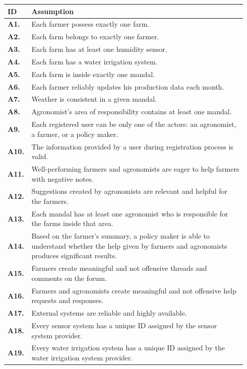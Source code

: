 \begin{longtable}{@{}p{0.06\linewidth} p{0.88\linewidth}}
	\toprule
	\textbf{ID}   & \textbf{Assumption}\\
	\midrule
    \textbf{A1.} & Each farmer possess exactly one farm.\\
    \textbf{A2.} & Each farm belongs to exactly one farmer.\\ 
    \textbf{A3.} & Each farm has at least one humidity sensor.\\ 
    \textbf{A4.} & Each farm has a water irrigation system.\\ 
    \textbf{A5.} & Each farm is inside exactly one mandal.\\ 
    \textbf{A6.} & Each farmer reliably updates his production data each month.\\ 
    \textbf{A7.} & Weather is consistent in a given mandal.\\ 
    \textbf{A8.} & Agronomist's area of responsibility contains at least one mandal.\\ 
    \textbf{A9.} & Each registered user can be only one of the actors: an agronomist, a farmer, or a policy maker.\\ 
    \textbf{A10.} & The information provided by a user during registration process is valid.\\ 
    \textbf{A11.} & Well-performing farmers and agronomists are eager to help farmers with negative notes.\\ 
    \textbf{A12.} & Suggestions created by agronomists are relevant and helpful for the farmers. \\
    \textbf{A13.} & Each mandal has at least one agronomist who is responsible for the farms inside that area.\\ 
    \textbf{A14.} & Based on the farmer's summary, a policy maker is able to understand whether the help given by farmers and agronomists produces significant results.\\ 
    \textbf{A15.} & Farmers create meaningful and not offensive threads and comments on the forum.\\ 
    \textbf{A16.} & Farmers and agronomists create meaningful and not offensive help requests and responses. \\
    \textbf{A17.} & External systems are reliable and highly available.\\
    \textbf{A18.} & Every sensor system has a unique ID assigned by the sensor system provider. \\
    \textbf{A19.} & Every water irrigation system has a unique ID assigned by the water irrigation system provider. \\
	\bottomrule
\end{longtable}
